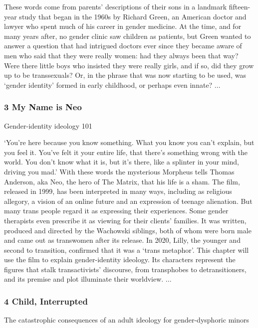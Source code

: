 \documentclass[10pt,titlepage]{book}
\begin{document}
These words come from parents’ descriptions of their sons in a landmark fifteen-year study that began in the 1960s by Richard Green, an American doctor and lawyer who spent much of his career in gender medicine. At the time, and for many years after, no gender clinic saw children as patients, but Green wanted to answer a question that had intrigued doctors ever since they became aware of men who said that they were really women: had they always been that way? Were there little boys who insisted they were really girls, and if so, did they grow up to be transsexuals? Or, in the phrase that was now starting to be used, was ‘gender identity’ formed in early childhood, or perhaps even innate?
...

\subsubsection{3 My Name is Neo}

Gender-identity ideology 101

‘You’re here because you know something. What you know you can’t explain, but you feel it. You’ve felt it your entire life, that there’s something wrong with the world. You don’t know what it is, but it’s there, like a splinter in your mind, driving you mad.’ With these words the mysterious Morpheus tells Thomas Anderson, aka Neo, the hero of The Matrix, that his life is a sham. The film, released in 1999, has been interpreted in many ways, including as religious allegory, a vision of an online future and an expression of teenage alienation. But many trans people regard it as expressing their experiences. Some gender therapists even prescribe it as viewing for their clients’ families. It was written, produced and directed by the Wachowski siblings, both of whom were born male and came out as transwomen after its release. In 2020, Lilly, the younger and second to transition, confirmed that it was a ‘trans metaphor’. This chapter will use the film to explain gender-identity ideology. Its characters represent the figures that stalk transactivists’ discourse, from transphobes to detransitioners, and its premise and plot illuminate their worldview.
...

\subsubsection{4 Child, Interrupted}

The catastrophic consequences of an adult ideology for gender-dysphoric minors
\end{document}
